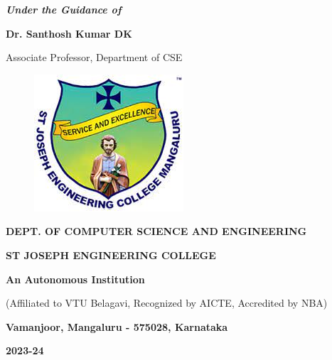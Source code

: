 \documentclass[12pt,a4paper]{report}
\begin{document}
\begin{center}
\vspace{12pt}
\textit{\textbf{Under the Guidance of}}
\par
\vspace{6pt}
\textbf{Dr. Santhosh Kumar DK}
\par
\vspace{2pt}
\normalsize {Associate Professor, Department of CSE}
\par
\begin{figure}[hbtp]
\centering
\includegraphics[scale=0.6]{./pic/sjeclogo.png}
\end{figure}
\large \textbf{DEPT. OF COMPUTER SCIENCE AND ENGINEERING}
\par \Large \textbf{ST JOSEPH ENGINEERING COLLEGE}
\par 
\textbf{An Autonomous Institution}
\par
{\large{(Affiliated to VTU Belagavi, Recognized by AICTE, Accredited by NBA)}}
\par
{\large \textbf{Vamanjoor, Mangaluru - 575028, Karnataka}}
\par 
{\Large \textbf{2023-24}}
\end{center}
\newpage
\end{document}
